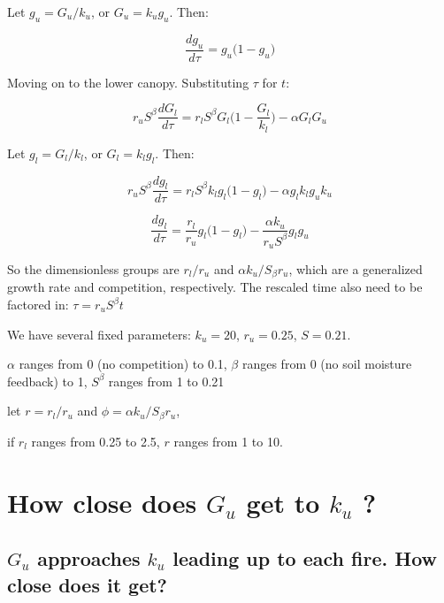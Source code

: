 \documentclass{article}
\begin{document}
Let  $g_u = G_u/k_u$, or   $G_u =   k_u g_u$.  Then:

\begin{equation*}
  \frac{d   g_u}{d\tau} =
	 g_u \bigg(1 -  g_u \bigg)
\end{equation*}

Moving on to the lower canopy.  Substituting $\tau$ for $t$:

\begin{equation*}
	 r_u S^\beta \frac{d G_l}{d \tau } = r_l S^\beta G_l \bigg(1-\frac{G_l}{k_l}\bigg) - \alpha G_l G_u
\end{equation*}

Let  $g_l = G_l/k_l$, or   $G_l =   k_l g_l$.  Then:

\begin{equation*}
r_u   S^\beta \frac{d g_l}{d \tau } = r_l S^\beta k_l g_l \big(1-g_l \big) - \alpha g_l k_l g_u k_u
\end{equation*}

\begin{equation*}
 \frac{d g_l}{d \tau } =\frac{ r_l}{r_u }  g_l \big(1-g_l \big) - \frac{\alpha k_u}{r_u  S^\beta}  g_l g_u
\end{equation*}

So the dimensionless groups are $r_l/r_u$ and $\alpha k_u / S_\beta r_u$, which are a generalized growth rate and competition, respectively.  The rescaled time also need to be factored in:  $\tau = r_u S^\beta t$


We have several fixed parameters:  $k_u = 20$, $r_u = 0.25$, $S=0.21$.

$\alpha$ ranges from 0 (no competition) to 0.1,
$\beta$ ranges from 0 (no soil moisture feedback) to 1, $S^\beta$ ranges from 1  to 0.21

let  $r = r_l/r_u$ and $\phi =  \alpha k_u / S_\beta r_u$,

if $r_l$ ranges from 0.25 to 2.5,  $r$ ranges from 1 to 10.



\section{How close does $G_u$ get to $k_u$ ?}
 \subsection{ $G_u$ approaches $k_u$  leading up to each fire. How close does it get?}
\end{document}
